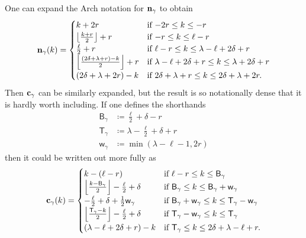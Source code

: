 \begin{remark}
  One can expand the Arch notation for $\mathbf n_\gamma$ to obtain
  \[
    \mathbf n_\gamma(k) =
    \begin{cases}
      k + 2r & \text{if } {-2r} \le k \le -r \\
      \left\lfloor \frac{k+r}{2} \right\rfloor + r & \text{if }{-r} \le k \le \ell-r \\
      \frac{\ell}{2} + r & \text{if } \ell - r \le k \le \lambda - \ell + 2\delta +  r \\
      \left\lfloor \frac{(2\delta+\lambda+r)-k}{2} \right\rfloor + r & \text{if } \lambda - \ell + 2\delta + r \le k \le \lambda + 2\delta + r \\
      (2\delta + \lambda + 2r) - k & \text{if } 2\delta + \lambda + r \le k \le 2\delta + \lambda + 2r.
    \end{cases}
  \]
  Then $\mathbf c_\gamma$ can be similarly expanded, but the result is so notationally dense
  that it is hardly worth including.
  If one defines the shorthands
  \begin{align*}
    \mathsf{B}_\gamma &\coloneqq \frac{\ell}{2} + \delta - r \\
    \mathsf{T}_\gamma &\coloneqq \lambda - \frac{\ell}{2} + \delta + r \\
    \mathsf{w}_\gamma &\coloneqq \min(\lambda-\ell-1, 2r)
  \end{align*}
  then it could be written out more fully as
  \[
    \mathbf c_\gamma(k) = \begin{cases}
      k - (\ell - r)
        & \text{if } \ell-r \le k \le \mathsf{B}_\gamma \\
      \left\lfloor \frac{k - \mathsf{B}_\gamma}{2} \right\rfloor - \frac{\ell}{2} + \delta
        &\text{if } \mathsf{B}_\gamma \le k \le \mathsf{B}_\gamma + \mathsf{w}_\gamma \\
      - \frac{\ell}{2} + \delta + \frac{1}{2} \mathsf{w}_\gamma
        &\text{if } \mathsf{B}_\gamma + \mathsf{w}_\gamma \le k \le \mathsf{T}_\gamma - \mathsf{w}_\gamma \\
      \left\lfloor \frac{\mathsf{T}_\gamma - k}{2} \right\rfloor - \frac{\ell}{2} + \delta
        &\text{if } \mathsf{T}_\gamma - \mathsf{w}_\gamma \le k \le \mathsf{T}_\gamma \\
        (\lambda - \ell + 2\delta + r) - k
        & \text{if } \mathsf{T}_\gamma \le k \le 2\delta + \lambda - \ell + r.
    \end{cases}
  \]
\end{remark}

